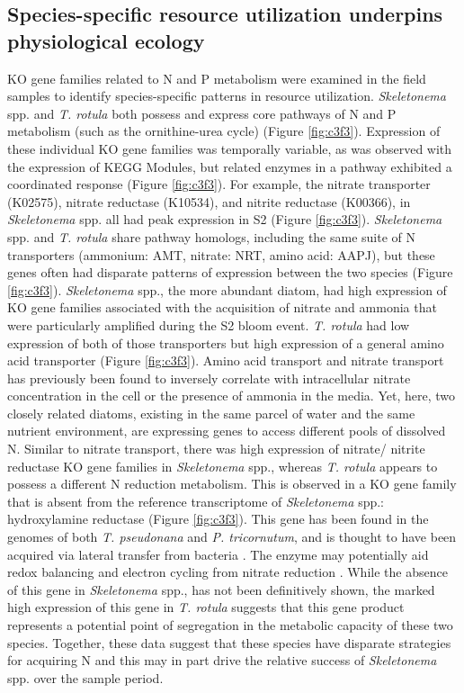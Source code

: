 \subsection{Species-specific resource utilization underpins physiological ecology}
KO gene families related to N and P metabolism were examined in the field samples to identify species-specific patterns in resource utilization. \textit{Skeletonema} spp. and \textit{T. rotula} both possess and express core pathways of N and P metabolism (such as the ornithine-urea cycle) (Figure \ref{fig:c3f3}). Expression of these individual KO gene families was temporally variable, as was observed with the expression of KEGG Modules, but related enzymes in a pathway exhibited a coordinated response (Figure \ref{fig:c3f3}). For example, the nitrate transporter (K02575), nitrate reductase (K10534), and nitrite reductase (K00366), in \textit{Skeletonema} spp. all had peak expression in S2 (Figure \ref{fig:c3f3}). \textit{Skeletonema} spp. and \textit{T. rotula} share pathway homologs, including the same suite of N transporters (ammonium: AMT, nitrate: NRT, amino acid: AAPJ), but these genes often had disparate patterns of expression between the two species (Figure \ref{fig:c3f3}). \textit{Skeletonema} spp., the more abundant diatom, had high expression of KO gene families associated with the acquisition of nitrate and ammonia that were particularly amplified during the S2 bloom event. \textit{T. rotula} had low expression of both of those transporters but high expression of a general amino acid transporter (Figure \ref{fig:c3f3}). Amino acid transport \citep{North1972} and nitrate transport \citep{Serra1978} has previously been found to inversely correlate with intracellular nitrate concentration in the cell or the presence of ammonia in the media. Yet, here, two closely related diatoms, existing in the same parcel of water and the same nutrient environment, are expressing genes to access different pools of dissolved N. Similar to nitrate transport, there was high expression of nitrate/ nitrite reductase KO gene families in \textit{Skeletonema} spp., whereas \textit{T. rotula} appears to possess a different N reduction metabolism. This is observed in a KO gene family that is absent from the reference transcriptome of \textit{Skeletonema} spp.: hydroxylamine reductase (Figure \ref{fig:c3f3}). This gene has been found in the genomes of both \textit{T. pseudonana} and \textit{P. tricornutum}, and is thought to have been acquired via lateral transfer from bacteria \citep{Bowler2008}. The enzyme may potentially aid redox balancing and electron cycling from nitrate reduction \citep{Allen2008}. While the absence of this gene in \textit{Skeletonema} spp., has not been definitively shown, the marked high expression of this gene in \textit{T. rotula} suggests that this gene product represents a potential point of segregation in the metabolic capacity of these two species. Together, these data suggest that these species have disparate strategies for acquiring N and this may in part drive the relative success of \textit{Skeletonema} spp. over the sample period.\par

